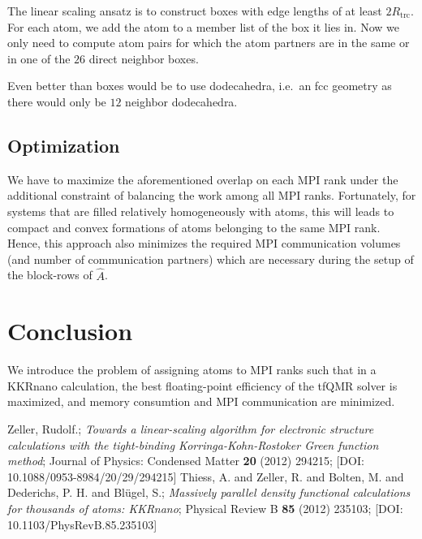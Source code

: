 \documentclass[a4paper]{article}
\newcommand{\MPIrank}{MPI rank} %
\newcommand{\um}[1]{_{\mathrm{#1}}}
\begin{document}
The linear scaling ansatz is to construct boxes with edge lengths of at least $2R\um{trc}$.
For each atom, we add the atom to a member list of the box it lies in.
Now we only need to compute atom pairs for which the atom partners are in the same or 
in one of the $26$ direct neighbor boxes.

Even better than boxes would be to use dodecahedra, 
i.e.~an fcc geometry as there would only be $12$ neighbor dodecahedra.

\subsection{Optimization}

We have to maximize the aforementioned overlap on each \MPIrank{}
under the additional constraint of balancing the work among all \MPIrank{}s.
Fortunately, for systems that are filled relatively homogeneously with atoms,
this will leads to compact and convex formations of atoms belonging to the same \MPIrank{}.
Hence, this approach also minimizes the required MPI communication volumes
(and number of communication partners)
which are necessary during the setup of the block-rows of $\hat A$.

\section{Conclusion}

We introduce the problem of assigning atoms to \MPIrank{}s
such that in a KKRnano calculation, 
the best floating-point efficiency of the tfQMR solver is maximized, and
memory consumtion and MPI communication are minimized.



\begin{thebibliography}{10}
 Zeller, Rudolf.;
   \textit{Towards a linear-scaling algorithm for electronic structure calculations with the tight-binding Korringa-Kohn-Rostoker {Green} function method};
    Journal of Physics: Condensed Matter \textbf{20} (2012) 294215;
    [DOI: 10.1088/0953-8984/20/29/294215]
 Thiess, A. and Zeller, R. and Bolten, M. and Dederichs, P. H. and Bl{\"u}gel, S.;
   \textit{Massively parallel density functional calculations for thousands of atoms: {KKRnano}};
    Physical Review B \textbf{85} (2012) 235103;
    [DOI: 10.1103/PhysRevB.85.235103]
\end{thebibliography}
\end{document}
